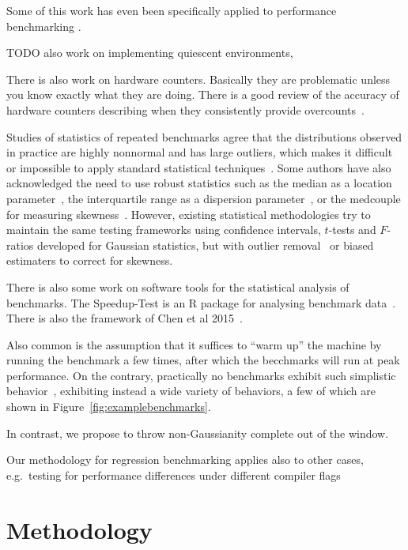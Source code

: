 \documentclass[conference]{IEEEtran}
\begin{document}
Some of this work has even been specifically applied to performance benchmarking \cite{Alcocer2015,Barrett2016}.

TODO also work on implementing quiescent environments,

There is also work on hardware counters. Basically they are problematic unless you know exactly what they are doing. There is a good review of the accuracy of hardware counters describing when they consistently provide overcounts~\cite{Weaver2013}.

Studies of statistics of repeated benchmarks agree that the distributions observed in practice are highly nonnormal and has large outliers, which makes it difficult or impossible to apply standard statistical techniques~\cite{Mytkowicz2009,Kalibera2013,Chen2015,Barrett2016}. Some authors have also acknowledged the need to use robust statistics such as the median as a location parameter~\cite{Mytkowicz2009}, the interquartile range as a dispersion parameter~\cite{Mytkowicz2009}, or the medcouple for measuring skewness~\cite{Rehn2015}.
However, existing statistical methodologies try to maintain the same testing frameworks using confidence intervals, $t$-tests and $F$-ratios developed for Gaussian statistics, but with outlier removal~\cite{Rehn2015} or biased estimaters to correct for skewness.

There is also some work on software tools for the statistical analysis of benchmarks. The Speedup-Test is an R package for analysing benchmark data~\cite{Touati2013}. There is also the framework of Chen et al 2015~\cite{Chen2015}.

Also common is the assumption that it suffices to ``warm up'' the machine by running the benchmark a few times, after which the becchmarks will run at peak performance. On the contrary, practically no benchmarks exhibit such simplistic behavior~\cite{Barrett2016}, exhibiting instead a wide variety of behaviors, a few of which are shown in Figure~\ref{fig:examplebenchmarks}.

In contrast, we propose to throw non-Gaussianity complete out of the window.

Our methodology for regression benchmarking applies also to other cases, e.g.\ testing for performance differences under different compiler flags~\cite{Mytkowicz2009}

\section{Methodology}
\end{document}
